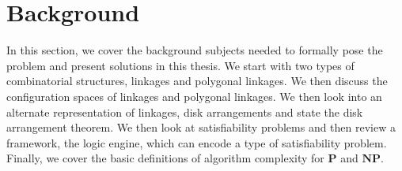 \chapter{Background}
In this section, we cover the background subjects needed to formally pose the 
problem and present solutions in this thesis.  We start with two types of combinatorial structures, linkages 
and polygonal linkages.  We then discuss the configuration spaces of linkages and polygonal 
linkages.   We then look into an alternate representation of linkages, disk arrangements and state 
the disk arrangement theorem.  We then look at satisfiability problems and then review a framework, the 
logic engine, which can encode a type of satisfiability problem.  Finally, we cover the basic 
definitions of algorithm complexity for $\textbf{P}$ and $\textbf{NP}$.
